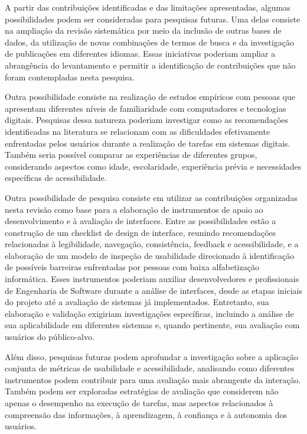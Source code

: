 A partir das contribuições identificadas e das limitações apresentadas, algumas possibilidades podem ser consideradas para pesquisas futuras. Uma delas consiste na ampliação da revisão sistemática por meio da inclusão de outras bases de dados, da utilização de novas combinações de termos de busca e da investigação de publicações em diferentes idiomas. Essas iniciativas poderiam ampliar a abrangência do levantamento e permitir a identificação de contribuições que não foram contempladas nesta pesquisa.

Outra possibilidade consiste na realização de estudos empíricos com pessoas que apresentam diferentes níveis de familiaridade com computadores e tecnologias digitais. Pesquisas dessa natureza poderiam investigar como as recomendações identificadas na literatura se relacionam com as dificuldades efetivamente enfrentadas pelos usuários durante a realização de tarefas em sistemas digitais. Também seria possível comparar as experiências de diferentes grupos, considerando aspectos como idade, escolaridade, experiência prévia e necessidades específicas de acessibilidade.

Outra possibilidade de pesquisa consiste em utilizar as contribuições organizadas nesta revisão como base para a elaboração de instrumentos de apoio ao desenvolvimento e à avaliação de interfaces. Entre as possibilidades estão a construção de um checklist de design de interface, reunindo recomendações relacionadas à legibilidade, navegação, consistência, feedback e acessibilidade, e a elaboração de um modelo de inspeção de usabilidade direcionado à identificação de possíveis barreiras enfrentadas por pessoas com baixa alfabetização informática. Esses instrumentos poderiam auxiliar desenvolvedores e profissionais de Engenharia de Software durante a análise de interfaces, desde as etapas iniciais do projeto até a avaliação de sistemas já implementados. Entretanto, sua elaboração e validação exigiriam investigações específicas, incluindo a análise de sua aplicabilidade em diferentes sistemas e, quando pertinente, sua avaliação com usuários do público-alvo.

Além disso, pesquisas futuras podem aprofundar a investigação sobre a aplicação conjunta de métricas de usabilidade e acessibilidade, analisando como diferentes instrumentos podem contribuir para uma avaliação mais abrangente da interação. Também podem ser exploradas estratégias de avaliação que considerem não apenas o desempenho na execução de tarefas, mas aspectos relacionados à compreensão das informações, à aprendizagem, à confiança e à autonomia dos usuários.


